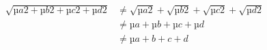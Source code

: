 \begin{align}
\sqrt{µ{a2}+µ{b2} + µ{c2}+ µ{d2}} & \neq \sqrt{µ{a2}} + \sqrt{µ{b2}} + \sqrt{µ{c2}} + \sqrt{µ{d2}}\\
& \neq µ{a} + µ{b} + µ{c} + µ{d} \\
& \neq µ{a+b+c+d}
\end{align}